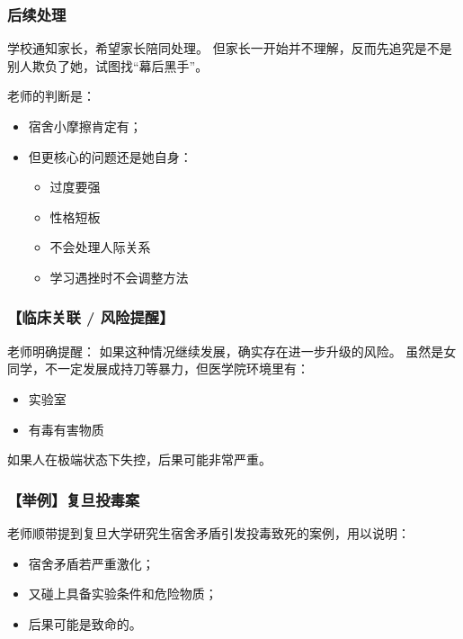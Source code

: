 \documentclass[
  chinese,
  9pt,
  a4paper,
]{ctexart}
\providecommand{\tightlist}{%
  \setlength{\itemsep}{0pt}\setlength{\parskip}{0pt}}
\begin{document}
\subsubsection{后续处理}\label{ux540eux7eedux5904ux7406}

学校通知家长，希望家长陪同处理。
但家长一开始并不理解，反而先追究是不是别人欺负了她，试图找``幕后黑手''。

老师的判断是：

\begin{itemize}
\item
  宿舍小摩擦肯定有；
\item
  但更核心的问题还是她自身：

  \begin{itemize}
  \tightlist
  \item
    过度要强
  \item
    性格短板
  \item
    不会处理人际关系
  \item
    学习遇挫时不会调整方法
  \end{itemize}
\end{itemize}

\subsubsection{【临床关联 /
风险提醒】}\label{ux4e34ux5e8aux5173ux8054-ux98ceux9669ux63d0ux9192}

老师明确提醒： 如果这种情况继续发展，确实存在进一步升级的风险。
虽然是女同学，不一定发展成持刀等暴力，但医学院环境里有：

\begin{itemize}
\tightlist
\item
  实验室
\item
  有毒有害物质
\end{itemize}

如果人在极端状态下失控，后果可能非常严重。

\subsubsection{【举例】复旦投毒案}\label{ux4e3eux4f8bux590dux65e6ux6295ux6bd2ux6848}

老师顺带提到复旦大学研究生宿舍矛盾引发投毒致死的案例，用以说明：

\begin{itemize}
\tightlist
\item
  宿舍矛盾若严重激化；
\item
  又碰上具备实验条件和危险物质；
\item
  后果可能是致命的。
\end{itemize}
\end{document}
